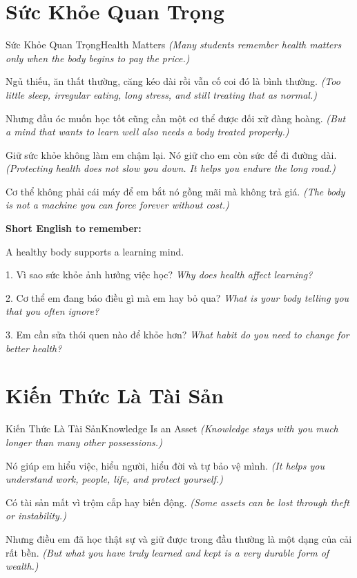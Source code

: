 \section{Sức Khỏe Quan Trọng}
\begin{truyen}{Sức Khỏe Quan Trọng}{Health Matters}
\textit{(Many students remember health matters only when the body begins to pay the price.)}

Ngủ thiếu, ăn thất thường, căng kéo dài rồi vẫn cố coi đó là bình thường.
\textit{(Too little sleep, irregular eating, long stress, and still treating that as normal.)}

Nhưng đầu óc muốn học tốt cũng cần một cơ thể được đối xử đàng hoàng.
\textit{(But a mind that wants to learn well also needs a body treated properly.)}

Giữ sức khỏe không làm em chậm lại. Nó giữ cho em còn sức để đi đường dài.
\textit{(Protecting health does not slow you down. It helps you endure the long road.)}
\end{truyen}

\begin{baihoc}
Cơ thể không phải cái máy để em bắt nó gồng mãi mà không trả giá.
\textit{(The body is not a machine you can force forever without cost.)}
\end{baihoc}

\begin{ghinhoanh}
\textbf{Short English to remember:}

A healthy body supports a learning mind.

\end{ghinhoanh}

\begin{tuhocnhanh}
1. Vì sao sức khỏe ảnh hưởng việc học? \textit{Why does health affect learning?}

2. Cơ thể em đang báo điều gì mà em hay bỏ qua? \textit{What is your body telling you that you often ignore?}

3. Em cần sửa thói quen nào để khỏe hơn? \textit{What habit do you need to change for better health?}
\end{tuhocnhanh}
\ngancach

\section{Kiến Thức Là Tài Sản}
\begin{truyen}{Kiến Thức Là Tài Sản}{Knowledge Is an Asset}
\textit{(Knowledge stays with you much longer than many other possessions.)}

Nó giúp em hiểu việc, hiểu người, hiểu đời và tự bảo vệ mình.
\textit{(It helps you understand work, people, life, and protect yourself.)}

Có tài sản mất vì trộm cắp hay biến động.
\textit{(Some assets can be lost through theft or instability.)}

Nhưng điều em đã học thật sự và giữ được trong đầu thường là một dạng của cải rất bền.
\textit{(But what you have truly learned and kept is a very durable form of wealth.)}
\end{truyen}

